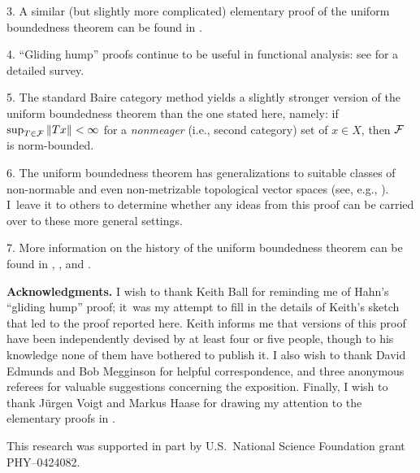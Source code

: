\documentclass[12pt]{article}
\begin{document}
3. A similar (but slightly more complicated) elementary proof
of the uniform boundedness theorem can be found in \cite[p.~83]{Gohberg_03}.

4.  ``Gliding hump'' proofs continue to be useful in functional analysis:
see \cite{Swartz_96} for a detailed survey.

5.  The standard Baire category method
yields a slightly stronger version of the uniform boundedness theorem
than the one stated here, namely:
if $\sup_{T \in {\mathcal{F}}} \|Tx\| < \infty$
for a {\em nonmeager}\/ (i.e., second category) set of $x \in X$,
then ${\mathcal{F}}$ is norm-bounded.

6.  The uniform boundedness theorem has generalizations
to suitable classes of non-normable
and even non-metrizable
topological vector spaces
(see, e.g., \cite[pp.~82--87]{Schaefer_99}).
I~leave it to others to determine whether any ideas from this proof
can be carried over to these more general settings.

7.  More information on the history of the uniform boundedness theorem
can be found in
\cite[pp.~302, 319n67]{Birkhoff_84},
\cite[pp.~138--142]{Dieudonne_81}, and
\cite[pp.~21--22, 40--43]{Pietsch_07}.



\bigskip
\bigskip

\noindent
{\bf Acknowledgments.}
I wish to thank Keith Ball for reminding me of Hahn's ``gliding hump'' proof;
it~was my attempt to fill in the details of Keith's sketch
that led to the proof reported here.
Keith informs me that versions of this proof have been independently devised
by at least four or five people,
though to his knowledge none of them have bothered to publish it.
I also wish to thank David Edmunds and Bob Megginson
for helpful correspondence, and three anonymous referees
for valuable suggestions concerning the exposition.
Finally, I wish to thank J\"urgen Voigt and Markus Haase
for drawing my attention to the elementary proofs in
\cite{Gohberg_03,Riesz_55,Weidmann_80}.

This research was supported in part by
U.S.\ National Science Foundation grant PHY--0424082.

\bigskip
\bigskip
\end{document}
